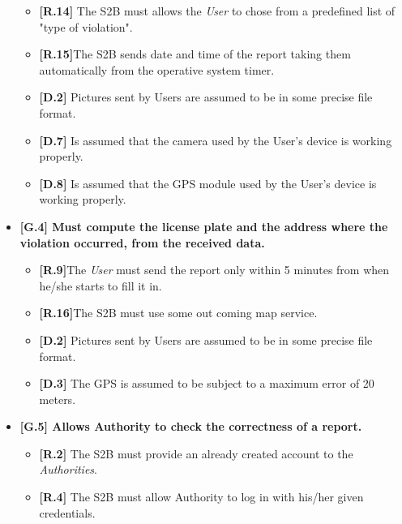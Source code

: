 \begin{itemize}
\begin{itemize}
        \item \textbf{[R.14]} The S2B must allows the \textit{User} to chose from a predefined list of "type of violation". 
        
        \item \textbf{[R.15]}The S2B sends date and time of the report taking them automatically from the operative system timer.
        
         \item \textbf{[D.2]} Pictures sent by Users are assumed to be in some precise file format.
        
         \item\textbf{[D.7]} Is assumed that the camera used by the User’s device is working properly.
         \item\textbf{[D.8]} Is assumed that the GPS module used by the User’s device  is working properly.
\end{itemize}


\item \textbf{{[G.4]} Must compute the license plate and the address where the violation occurred, from the received data.}

    \begin{itemize}
         \item \textbf{[R.9]}The \textit{User} must send the report only within 5 minutes from when he/she starts to fill it in. 
         
        \item \textbf{[R.16]}The S2B must use some out coming map service.
        
        \item \textbf{[D.2]} Pictures sent by Users are assumed to be in some precise file format.
         
       \item \textbf{[D.3]} The GPS is assumed to be subject to a maximum error of 20 meters.
    \end{itemize}
    
    
    
\item \textbf{{[G.5]} Allows Authority to check the correctness of a report.}

    \begin{itemize}
         \item \textbf{[R.2]} The S2B must provide an already created account to the \textit{Authorities}.
         
         \item \textbf{[R.4]} The S2B must allow Authority to log in with his/her given credentials.
      

\end{itemize}
\end{itemize}
